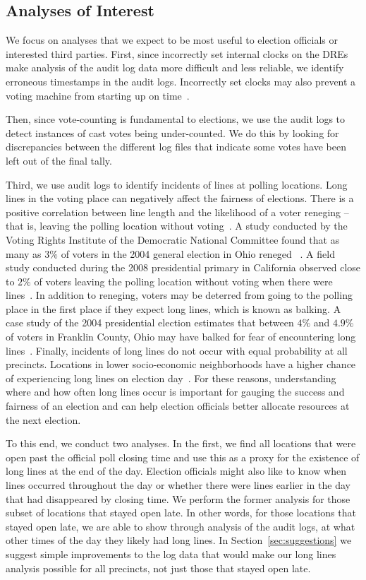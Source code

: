 \documentclass[letterpaper,twocolumn,10pt]{article}
\begin{document}
\subsection{Analyses of Interest}
We focus on analyses that we expect to be most useful to election officials or
interested third parties. First, since incorrectly set internal clocks on the
DREs make analysis of the audit log data more difficult and less reliable, we
identify erroneous timestamps in the audit logs. Incorrectly set
clocks may also prevent a voting machine from starting up on
time~\cite{VotUn2007}.

Then, since vote-counting is fundamental to
elections, we use the audit logs to detect instances of cast votes being
under-counted. We do this by looking for discrepancies between the
different log files that indicate some votes have been left out of the final
tally. 

Third, we use audit logs to identify incidents of lines at polling
locations. Long lines in the voting place can
negatively affect the fairness of elections. There is a positive correlation
between line length and the likelihood of a voter reneging -- that is, leaving
the polling location without voting~\cite{Spencer2010}. A study conducted by the
Voting Rights Institute of the Democratic National Committee found that as many
as $3\%$ of voters in the 2004 general election in Ohio reneged
~\cite{DNC2005}. A field study conducted 
during the 2008 presidential primary in California observed close to $2\%$
of voters leaving the polling location without voting when there were
lines~\cite{Spencer2010}. In addition to reneging, voters may be deterred from
going to the polling place in the first place if they expect long lines, which is
known as balking. A case study of the 2004 presidential election estimates that
between $4\%$ and $4.9\%$ of voters in Franklin County, Ohio may have balked for
fear of encountering long lines~\cite{Allen2006}. Finally, incidents of long
lines do not occur with equal probability at all precincts. Locations in lower
socio-economic neighborhoods have a higher chance of experiencing long lines on
election day~\cite{Spencer2010,DNC2005}. For these reasons, understanding where  
and how often long lines occur is important for gauging the success and fairness
of an election and can help election officials better allocate resources at the
next election. 

To this end, we conduct two analyses. In the first, we find all
locations that were open past the official poll closing time and use this as a
proxy for the existence of long lines at the end of the day. Election officials
might also like to know when lines occurred throughout the day or whether there
were lines earlier in the day that had disappeared by closing time. We perform
the former 
analysis for those subset of locations that stayed open late. In other words,
for those locations that stayed open late, we are able to show through analysis
of the audit logs, at what other times of the day they likely had long
lines. In Section~\ref{sec:suggestions} we suggest simple improvements to the log
data that would make our long lines analysis possible for all precincts, not
just those that stayed open late.
\end{document}
